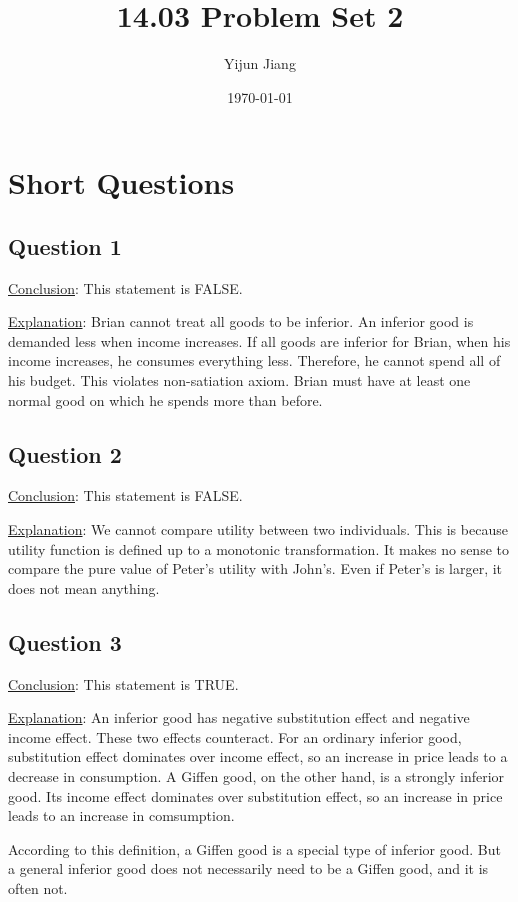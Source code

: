 \documentclass{article}
\title{14.03 Problem Set 2}
\author{Yijun Jiang}
\date{\today}
\begin{document}
\maketitle

\section{Short Questions}
\subsection{Question 1}
\noindent\underline{Conclusion}: This statement is FALSE.

\noindent\underline{Explanation}: Brian cannot treat all goods to be inferior. An inferior good is demanded less when income increases. If all goods are inferior for Brian, when his income increases, he consumes everything less. Therefore, he cannot spend all of his budget. This violates non-satiation axiom. Brian must have at least one normal good on which he spends more than before.

\subsection{Question 2}
\noindent\underline{Conclusion}: This statement is FALSE.

\noindent\underline{Explanation}: We cannot compare utility between two individuals. This is because utility function is defined up to a monotonic transformation. It makes no sense to compare the pure value of Peter's utility with John's. Even if Peter's is larger, it does not mean anything.

\subsection{Question 3}
\noindent\underline{Conclusion}: This statement is TRUE.

\noindent\underline{Explanation}: An inferior good has negative substitution effect and negative income effect. These two effects counteract. For an ordinary inferior good, substitution effect dominates over income effect, so an increase in price leads to a decrease in consumption. A Giffen good, on the other hand, is a strongly inferior good. Its income effect dominates over substitution effect, so an increase in price leads to an increase in comsumption.

According to this definition, a Giffen good is a special type of inferior good. But a general inferior good does not necessarily need to be a Giffen good, and it is often not.
\end{document}
